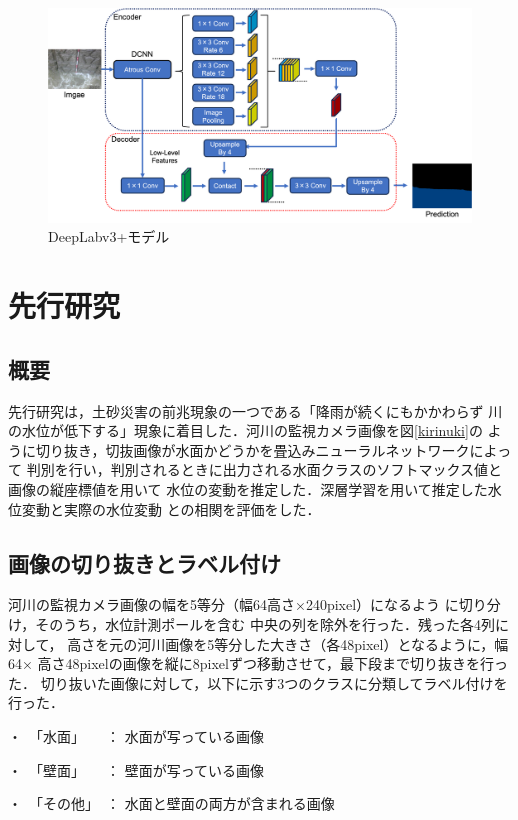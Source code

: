\begin{figure}[ht] 
  \begin{center}
    \includegraphics[width=\linewidth]{image/DeepLabv3+.png}
  \end{center}
  \caption{DeepLabv3+モデル}
  \label{figure:DeepLabv3+}
\end{figure}
\clearpage
\section{先行研究}
\subsection{概要}
\label{3.1}
先行研究\cite{watanabe}は，土砂災害の前兆現象の一つである「降雨が続くにもかかわらず
川の水位が低下する」現象に着目した．河川の監視カメラ画像を図\ref{kirinuki}の
ように切り抜き，切抜画像が水面かどうかを畳込みニューラルネットワークによって
判別を行い，判別されるときに出力される水面クラスのソフトマックス値と画像の縦座標値を用いて
水位の変動を推定した．深層学習を用いて推定した水位変動と実際の水位変動
との相関を評価をした．

\subsection{画像の切り抜きとラベル付け}
\label{3.2}
河川の監視カメラ画像の幅を5等分（幅64高さ×240pixel）になるよう
に切り分け，そのうち，水位計測ポールを含む
中央の列を除外を行った．残った各4列に対して，
高さを元の河川画像を5等分した大きさ（各48pixel）となるように，幅64×
高さ48pixelの画像を縦に8pixelずつ移動させて，最下段まで切り抜きを行った．
切り抜いた画像に対して，以下に示す3つのクラスに分類してラベル付けを行った．
\begin{description}
    \item・　「水面」　　： 水面が写っている画像
    \vspace{-2mm}
    \item・　「壁面」　　： 壁面が写っている画像
    \vspace{-2mm}
    \item・　「その他」　： 水面と壁面の両方が含まれる画像
\end{description}

